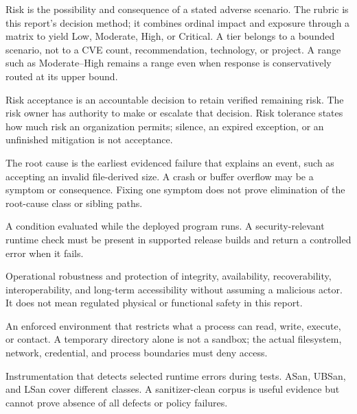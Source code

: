\documentclass[../main.tex]{subfiles}
\begin{document}
\begin{description}[leftmargin=1.5em,style=nextline]
\item[Risk / risk rubric / risk tier.]
Risk is the possibility and consequence of a stated adverse scenario. The
rubric is this report's decision method; it combines ordinal impact and
exposure through a matrix to yield Low, Moderate, High, or Critical. A tier
belongs to a bounded scenario, not to a CVE count, recommendation, technology,
or project. A range such as Moderate--High remains a range even when response
is conservatively routed at its upper bound.

\item[Risk acceptance / risk owner / risk tolerance.]
Risk acceptance is an accountable decision to retain verified remaining risk.
The risk owner has authority to make or escalate that decision. Risk tolerance
states how much risk an organization permits; silence, an expired exception, or
an unfinished mitigation is not acceptance.

\item[Root cause / symptom / consequence.]
The root cause is the earliest evidenced failure that explains an event, such
as accepting an invalid file-derived size. A crash or buffer overflow may be a
symptom or consequence. Fixing one symptom does not prove elimination of the
root-cause class or sibling paths.

\item[Runtime check.]
A condition evaluated while the deployed program runs. A security-relevant
runtime check must be present in supported release builds and return a
controlled error when it fails.

\item[Safety.]
Operational robustness and protection of integrity, availability,
recoverability, interoperability, and long-term accessibility without assuming
a malicious actor. It does not mean regulated physical or functional safety in
this report.

\item[Sandbox.]
An enforced environment that restricts what a process can read, write, execute,
or contact. A temporary directory alone is not a sandbox; the actual
filesystem, network, credential, and process boundaries must deny access.

\item[Sanitizer.]
Instrumentation that detects selected runtime errors during tests. ASan,
UBSan, and LSan cover different classes. A sanitizer-clean corpus is useful
evidence but cannot prove absence of all defects or policy failures.


\end{description}
\end{document}
